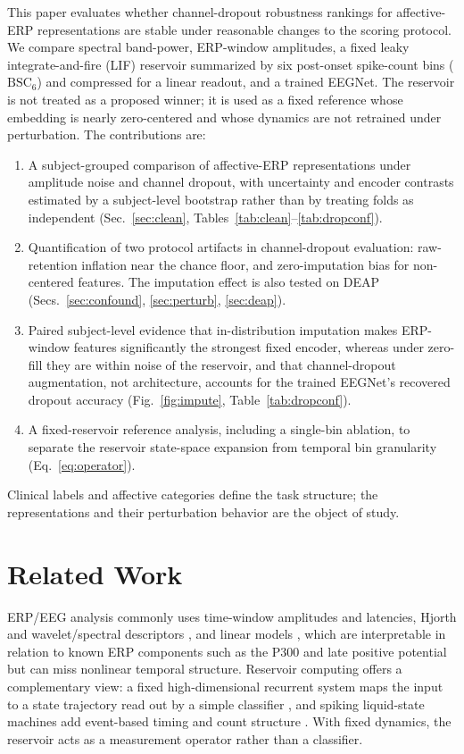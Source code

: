 \documentclass[conference]{IEEEtran}
\newcommand{\BSC}{\ensuremath{\mathrm{BSC}_{6}}}
\begin{document}
This paper evaluates whether channel-dropout robustness rankings for affective-ERP representations are stable under reasonable changes to the scoring protocol. We compare spectral band-power, ERP-window amplitudes, a fixed leaky integrate-and-fire (LIF) reservoir summarized by six post-onset spike-count bins (\BSC{}) and compressed for a linear readout, and a trained EEGNet. The reservoir is not treated as a proposed winner; it is used as a fixed reference whose embedding is nearly zero-centered and whose dynamics are not retrained under perturbation. The contributions are:
\begin{enumerate}
    \item A subject-grouped comparison of affective-ERP representations under amplitude noise and channel dropout, with uncertainty and encoder contrasts estimated by a subject-level bootstrap rather than by treating folds as independent (Sec.~\ref{sec:clean}, Tables~\ref{tab:clean}--\ref{tab:dropconf}).
    \item Quantification of two protocol artifacts in channel-dropout evaluation: raw-retention inflation near the chance floor, and zero-imputation bias for non-centered features. The imputation effect is also tested on DEAP (Secs.~\ref{sec:confound}, \ref{sec:perturb}, \ref{sec:deap}).
    \item Paired subject-level evidence that in-distribution imputation makes ERP-window features significantly the strongest fixed encoder, whereas under zero-fill they are within noise of the reservoir, and that channel-dropout augmentation, not architecture, accounts for the trained EEGNet's recovered dropout accuracy (Fig.~\ref{fig:impute}, Table~\ref{tab:dropconf}).
    \item A fixed-reservoir reference analysis, including a single-bin ablation, to separate the reservoir state-space expansion from temporal bin granularity (Eq.~\eqref{eq:operator}).
\end{enumerate}
Clinical labels and affective categories define the task structure; the representations and their perturbation behavior are the object of study.

\section{Related Work}
ERP/EEG analysis commonly uses time-window amplitudes and latencies, Hjorth \cite{hjorth1970eeg} and wavelet/spectral descriptors \cite{subasi2007eeg}, and linear models \cite{blankertz2011singletrial}, which are interpretable in relation to known ERP components such as the P300 and late positive potential \cite{makeig2002dynamic} but can miss nonlinear temporal structure. Reservoir computing offers a complementary view: a fixed high-dimensional recurrent system maps the input to a state trajectory read out by a simple classifier \cite{maass2002real,jaeger2001echo,jaeger2004harnessing,lukosevicius2009reservoir}, and spiking liquid-state machines add event-based timing and count structure \cite{diehl2015unsupervised,roy2019towards}. With fixed dynamics, the reservoir acts as a measurement operator rather than a classifier.
\end{document}
